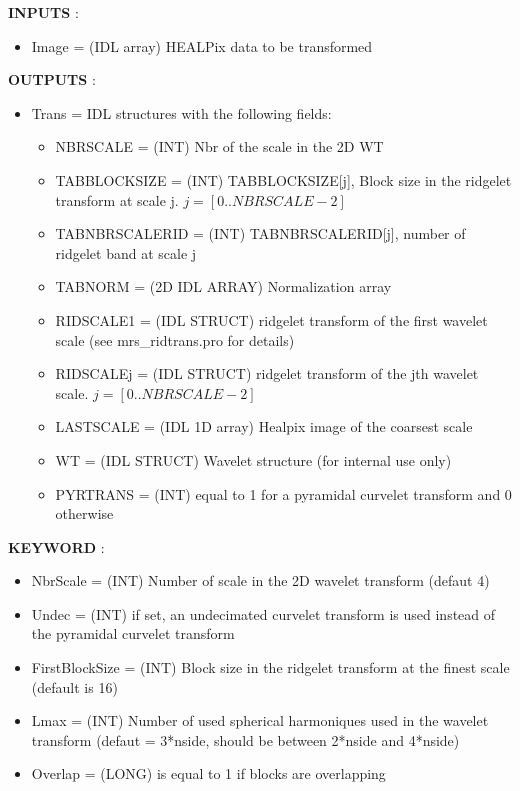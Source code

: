 \textbf{INPUTS} : 
\begin{itemize}
\item{Image = (IDL array) HEALPix data to be transformed}
\end{itemize}

\textbf{OUTPUTS} : 
\begin{itemize}
\item Trans = IDL structures with the following fields:
 \begin{itemize}
  \item NBRSCALE = (INT) Nbr of the scale in the 2D WT
  \item TABBLOCKSIZE = (INT) TABBLOCKSIZE[j], Block size in the ridgelet transform at scale j.
  $j = [0..NBRSCALE-2]$
  \item TABNBRSCALERID = (INT) TABNBRSCALERID[j], number of ridgelet band at scale j 
  \item TABNORM = (2D IDL ARRAY) Normalization array
  \item RIDSCALE1 = (IDL STRUCT) ridgelet transform of the first wavelet scale (see mrs\_ridtrans.pro for details)
  \item RIDSCALEj = (IDL STRUCT) ridgelet transform of the jth wavelet scale.
  $j = [0..NBRSCALE-2]$
  \item LASTSCALE = (IDL 1D array) Healpix image of the coarsest scale
  \item WT = (IDL STRUCT) Wavelet structure (for internal use only)
  \item PYRTRANS = (INT) equal to 1 for a pyramidal curvelet transform and 0 otherwise
 \end{itemize}
\end{itemize}

\textbf{KEYWORD} :

\begin{itemize}
  \item NbrScale = (INT) Number of scale in the 2D wavelet transform (defaut 4)
  \item Undec = (INT) if set, an undecimated curvelet transform is used instead of the pyramidal curvelet transform
  \item FirstBlockSize = (INT) Block size in the ridgelet transform at the finest scale (default is 16)
  \item Lmax = (INT) Number of used spherical harmoniques used in the wavelet transform (defaut = 3*nside, should be between 2*nside and 4*nside)
  \item Overlap = (LONG) is equal to 1 if blocks are overlapping
\end{itemize}

